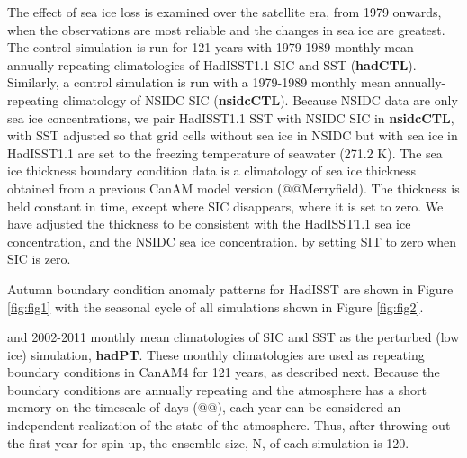 \documentclass[twocol]{ametsoc}
\begin{document}
The effect of sea ice loss is examined over the satellite era, from 1979 onwards, when the observations are most reliable and the changes in sea ice are greatest. The control simulation is run for 121 years with 1979-1989 monthly mean annually-repeating climatologies of HadISST1.1 SIC and SST (\textbf{hadCTL}). Similarly, a control simulation is run with a 1979-1989 monthly mean annually-repeating climatology of NSIDC SIC (\textbf{nsidcCTL}). Because NSIDC data are only sea ice concentrations, we pair HadISST1.1 SST with NSIDC SIC in \textbf{nsidcCTL}, with SST adjusted so that grid cells without sea ice in NSIDC but with sea ice in HadISST1.1 are set to the freezing temperature of seawater (271.2 K). The sea ice thickness boundary condition data is a climatology of sea ice thickness obtained from a previous CanAM model version (@@Merryfield). The thickness is held constant in time, except where SIC disappears, where it is set to zero. We have adjusted the thickness to be consistent with the HadISST1.1 sea ice concentration, and the NSIDC sea ice concentration. by setting SIT to zero when SIC is zero.



Autumn boundary condition anomaly patterns for HadISST are shown in Figure \ref{fig:fig1} with the seasonal cycle of all simulations shown in Figure \ref{fig:fig2}.


 and 2002-2011 monthly mean climatologies of SIC and SST as the perturbed (low ice) simulation, \textbf{hadPT}. These monthly climatologies are used as repeating boundary conditions in CanAM4 for 121 years, as described next. Because the boundary conditions are annually repeating and the atmosphere has a short memory on the timescale of days (@@), each year can be considered an independent realization of the state of the atmosphere. Thus, after throwing out the first year for spin-up, the ensemble size, N, of each simulation is 120.  %
\end{document}
